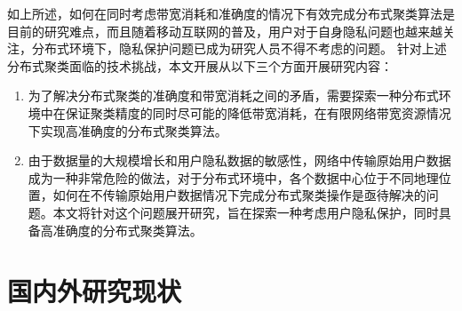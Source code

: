 如上所述，如何在同时考虑带宽消耗和准确度的情况下有效完成分布式聚类算法是目前的研究难点，而且随着移动互联网的普及，用户对于自身隐私问题也越来越关注，分布式环境下，隐私保护问题已成为研究人员不得不考虑的问题。
针对上述分布式聚类面临的技术挑战，本文开展从以下三个方面开展研究内容：
\begin{enumerate}
\item 为了解决分布式聚类的准确度和带宽消耗之间的矛盾，需要探索一种分布式环境中在保证聚类精度的同时尽可能的降低带宽消耗，在有限网络带宽资源情况下实现高准确度的分布式聚类算法。
\item 由于数据量的大规模增长和用户隐私数据的敏感性，网络中传输原始用户数据成为一种非常危险的做法，对于分布式环境中，各个数据中心位于不同地理位置，如何在不传输原始用户数据情况下完成分布式聚类操作是亟待解决的问题。本文将针对这个问题展开研究，旨在探索一种考虑用户隐私保护，同时具备高准确度的分布式聚类算法。
\end{enumerate}


\section{国内外研究现状}



